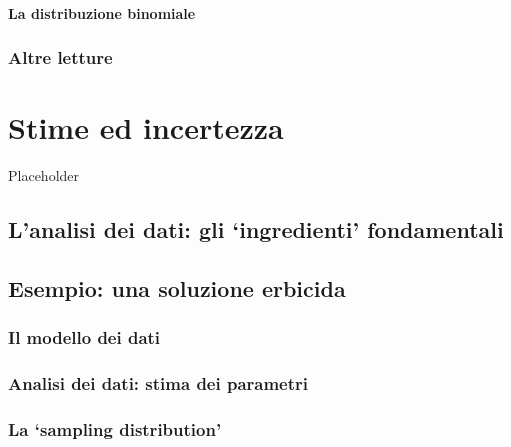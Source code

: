 \documentclass[a4paper,12pt,oneside]{book}
\begin{document}
\hypertarget{la-distribuzione-binomiale}{%
\subsubsection{La distribuzione binomiale}\label{la-distribuzione-binomiale}}

\hypertarget{altre-letture}{%
\subsection{Altre letture}\label{altre-letture}}

\hypertarget{stime-ed-incertezza}{%
\chapter{Stime ed incertezza}\label{stime-ed-incertezza}}

Placeholder

\hypertarget{lanalisi-dei-dati-gli-ingredienti-fondamentali}{%
\section{L'analisi dei dati: gli `ingredienti' fondamentali}\label{lanalisi-dei-dati-gli-ingredienti-fondamentali}}

\hypertarget{esempio-una-soluzione-erbicida}{%
\section{Esempio: una soluzione erbicida}\label{esempio-una-soluzione-erbicida}}

\hypertarget{il-modello-dei-dati}{%
\subsection{Il modello dei dati}\label{il-modello-dei-dati}}

\hypertarget{analisi-dei-dati-stima-dei-parametri}{%
\subsection{Analisi dei dati: stima dei parametri}\label{analisi-dei-dati-stima-dei-parametri}}

\hypertarget{la-sampling-distribution}{%
\subsection{La `sampling distribution'}\label{la-sampling-distribution}}
\end{document}
